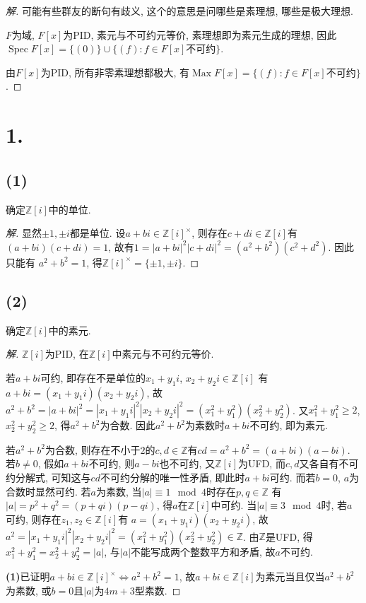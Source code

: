 \documentclass[12pt, a4paper, fontset=windows]{ctexart}
\newcommand{\Z}{\mathbb{Z}}
\newcommand{\Max}{\operatorname{Max}}
\newcommand{\Spec}{\operatorname{Spec}}
\newcommand{\abs}[1]{\left|{#1}\right|}
\newenvironment{solution}{\begin{proof}[解]}{\end{proof}}
\begin{document}
\begin{solution}
可能有些群友的断句有歧义, 这个的意思是问哪些是素理想, 哪些是极大理想. 

$F$为域, $F[x]$为PID, 素元与不可约元等价, 
素理想即为素元生成的理想, 
因此$\Spec F[x]=\{(0)\}\cup\{(f):f\in F[x]$不可约$\}$. 

由$F[x]$为PID, 所有非零素理想都极大, 有$\Max F[x]=\{(f):f\in F[x]$不可约$\}$. 
\end{solution}

\section*{1.}
\label{Zi-unit-prime}

\subsection*{(1)}

确定$\Z[i]$中的单位. 

\begin{solution}
显然$\pm 1,\pm i$都是单位. 
设$a+bi\in\Z[i]^{\times}$, 则存在$c+di\in\Z[i]$有$(a+bi)(c+di)=1$, 
故有$1=\abs{a+bi}^2\abs{c+di}^2=(a^2+b^2)(c^2+d^2)$. 因此只能有
$a^2+b^2=1$, 得$\Z[i]^{\times}=\{\pm 1,\pm i\}$. 
\end{solution}

\subsection*{(2)}

确定$\Z[i]$中的素元. 

\begin{solution}
$\Z[i]$为PID, 在$\Z[i]$中素元与不可约元等价. 

若$a+bi$可约, 即存在不是单位的$x_1+y_1i$, $x_2+y_2i\in\Z[i]$
有$a+bi=(x_1+y_1i)(x_2+y_2i)$, 故
$a^2+b^2=\abs{a+bi}^2=\abs{x_1+y_1i}^2\abs{x_2+y_2i}^2=(x_1^2+y_1^2)(x_2^2+y_2^2)$. 
又$x_1^2+y_1^2\ge 2$, $x_2^2+y_2^2\ge 2$, 得$a^2+b^2$为合数. 
因此$a^2+b^2$为素数时$a+bi$不可约, 即为素元. 

若$a^2+b^2$为合数, 则存在不小于$2$的$c,d\in\Z$有$cd=a^2+b^2=(a+bi)(a-bi)$. 
若$b\ne 0$, 假如$a+bi$不可约, 则$a-bi$也不可约, 又$\Z[i]$为UFD, 
而$c,d$又各自有不可约分解式, 可知这与$cd$不可约分解的唯一性矛盾, 即此时$a+bi$可约. 
而若$b=0$, $a$为合数时显然可约. 若$a$为素数, 当$\abs{a}\equiv 1\mod{4}$时存在$p,q\in\Z$
有$\abs{a}=p^2+q^2=(p+qi)(p-qi)$, 得$a$在$\Z[i]$中可约. 
当$\abs{a}\equiv 3\mod{4}$时, 若$a$可约, 则存在$z_1,z_2\in\Z[i]$有
$a=(x_1+y_1i)(x_2+y_2i)$, 故$a^2=\abs{x_1+y_1i}^2\abs{x_2+y_2i}^2=(x_1^2+y_1^2)(x_2^2+y_2^2)\in\Z$. 
由$\Z$是UFD, 得$x_1^2+y_1^2=x_2^2+y_2^2=\abs{a}$, 
与$\abs{a}$不能写成两个整数平方和矛盾, 故$a$不可约. 

{\bf (1)}已证明$a+bi\in\Z[i]^{\times}\iff a^2+b^2=1$, 
故$a+bi\in\Z[i]$为素元当且仅当$a^2+b^2$为素数, 或$b=0$且$\abs{a}$为$4m+3$型素数. 
\end{solution}
\end{document}
